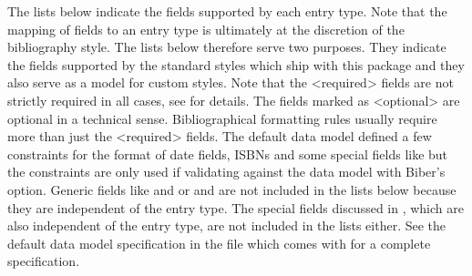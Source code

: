 \documentclass{ltxdockit}[2011/03/25]
\newcommand*{\biber}{Biber\xspace}
\begin{document}
The lists below indicate the fields supported by each entry type. Note that the mapping of fields to an entry type is ultimately at the discretion of the bibliography style. The lists below therefore serve two purposes. They indicate the fields supported by the standard styles which ship with this package and they also serve as a model for custom styles. Note that the <required> fields are not strictly required in all cases, see  for details. The fields marked as <optional> are optional in a technical sense. Bibliographical formatting rules usually require more than just the <required> fields. The default data model defined a few constraints for the format of date fields, ISBNs and some special fields like  but the constraints are only used if validating against the data model with \biber's  option. Generic fields like  and  or  and  are not included in the lists below because they are independent of the entry type. The special fields discussed in , which are also independent of the entry type, are not included in the lists either. See the default data model specification in the file  which comes with  for a complete specification.
\end{document}
